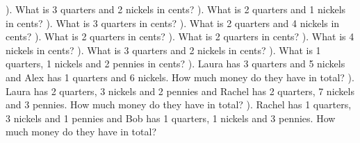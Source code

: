 \documentclass{article}%
\begin{document}
\newline%
). What is 3 quarters and 2 nickels in cents?%
\newline%
\newline%
). What is 2 quarters and 1 nickels in cents?%
\newline%
\newline%
). What is 3 quarters in cents?%
\newline%
\newline%
). What is 2 quarters and 4 nickels in cents?%
\newline%
\newline%
). What is 2 quarters in cents?%
\newline%
\newline%
). What is 2 quarters in cents?%
\newline%
\newline%
). What is 4 nickels in cents?%
\newline%
\newline%
). What is 3 quarters and 2 nickels in cents?%
\newline%
\newline%
). What is 1 quarters, 1 nickels and 2 pennies in cents?%
\newline%
\newline%
). Laura has 3 quarters and 5 nickels and Alex has 1 quarters and 6 nickels. How much money do they have in total?%
\newline%
\newline%
). Laura has 2 quarters, 3 nickels and 2 pennies and Rachel has 2 quarters, 7 nickels and 3 pennies. How much money do they have in total?%
\newline%
\newline%
). Rachel has 1 quarters, 3 nickels and 1 pennies and Bob has 1 quarters, 1 nickels and 3 pennies. How much money do they have in total?%
\newline%
\newline%
\end{document}
